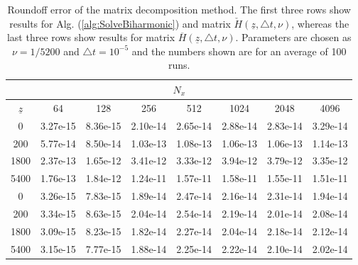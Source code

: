 \documentclass[preprint]{elsarticle}
\newcommand{\N}[1]{\check{#1}}
\newcommand{\D}[1]{\overline{#1}}
\begin{document}
\begin{table}
	\caption{ Roundoff error of the matrix decomposition method. The first three 
	rows show results for Alg. (\ref{alg:SolveBiharmonic}) and matrix $\N{H}(\underline{z}, 
	\triangle t, \nu)$, whereas the last three rows show results for matrix 
	$\D{H}(\underline{z}, \triangle t, \nu)$. Parameters 
	are chosen as $\nu=1/5200$ and $\triangle t=10^{-5}$ and the numbers shown 
	are for an average of 100 runs.	 \label{tab:roundoff}}
   \begin{tabular}{cccccccc}
	   \multicolumn{8}{c}{$N_x$} \\
	   \hline
$\underline{z}$ & 64 & 128 & 256 & 512 & 1024 & 2048 & 4096 \\ 
\hline
0 & 3.27e-15  & 8.36e-15  & 2.10e-14  & 2.65e-14  & 2.88e-14  & 2.83e-14  & 3.29e-14  \\ 
200 & 5.77e-14  & 8.50e-14  & 1.03e-13  & 1.08e-13  & 1.06e-13  & 1.06e-13  & 1.14e-13  \\ 
1800 & 2.37e-13  & 1.65e-12  & 3.41e-12  & 3.33e-12  & 3.94e-12  & 3.79e-12  & 3.35e-12  \\ 
5400 & 1.76e-13  & 1.84e-12  & 1.24e-11  & 1.57e-11  & 1.58e-11  & 1.55e-11  & 1.51e-11  \\ 
\hline
0 & 3.26e-15  & 7.83e-15  & 1.89e-14  & 2.47e-14  & 2.16e-14  & 2.31e-14  & 1.94e-14  \\ 
200 & 3.34e-15  & 8.63e-15  & 2.04e-14  & 2.54e-14  & 2.19e-14  & 2.01e-14  & 2.08e-14  \\ 
1800 & 3.09e-15  & 8.23e-15  & 1.82e-14  & 2.27e-14  & 2.04e-14  & 2.18e-14  & 2.12e-14  \\ 
5400 & 3.15e-15  & 7.77e-15  & 1.88e-14  & 2.25e-14  & 2.22e-14  & 2.10e-14  & 2.02e-14 
		
\end{tabular}
\end{table}
\end{document}
